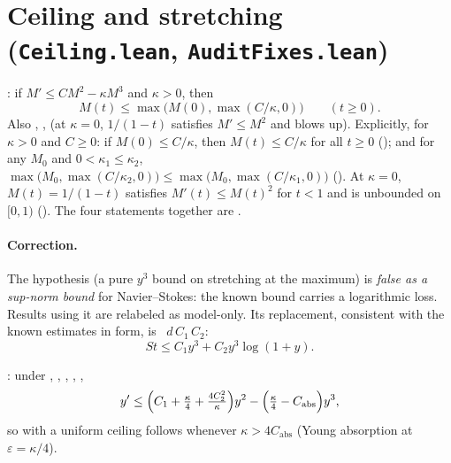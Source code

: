 \documentclass[11pt]{article}
\begin{document}
\section{Ceiling and stretching (\texttt{Ceiling.lean}, \texttt{AuditFixes.lean})}\label{sec:ceiling}
\begin{theorem}\coined: if $M'\le CM^2-\kappa M^3$ and $\kappa>0$, then
\begin{equation}\label{eq:ceiling}M(t)\le\max\bigl(M(0),\max(C/\kappa,0)\bigr)\qquad(t\ge0).\end{equation} Also , , \coined{} (at $\kappa=0$, $1/(1-t)$ satisfies $M'\le M^2$ and blows up). Explicitly, for $\kappa>0$ and $C\ge0$: if $M(0)\le C/\kappa$, then $M(t)\le C/\kappa$ for all $t\ge0$ (); and for any $M_0$ and $0<\kappa_1\le\kappa_2$, $\max\bigl(M_0,\max(C/\kappa_2,0)\bigr)\le\max\bigl(M_0,\max(C/\kappa_1,0)\bigr)$ (). At $\kappa=0$, $M(t)=1/(1-t)$ satisfies $M'(t)\le M(t)^2$ for $t<1$ and is unbounded on $[0,1)$ (). The four statements together are .\end{theorem}
\paragraph{Correction.} The hypothesis  (a pure $y^3$ bound on stretching at the maximum) is \emph{false as a sup-norm bound} for Navier--Stokes: the known bound carries a logarithmic loss. Results using it are relabeled as model-only. Its replacement, consistent with the known estimates in form, is ~$d\,C_1\,C_2$\coined: \[St\le C_1y^3+C_2y^3\log(1+y).\]
\begin{theorem}\coined: under , , , , ,
\[y'\le\Bigl(C_1+\tfrac{\kappa}{4}+\tfrac{4C_2^2}{\kappa}\Bigr)y^2-\Bigl(\tfrac{\kappa}{4}-C_{\mathrm{abs}}\Bigr)y^3,\]
so with  a uniform ceiling follows whenever $\kappa>4C_{\mathrm{abs}}$ (Young absorption at $\varepsilon=\kappa/4$).\end{theorem}
\end{document}
